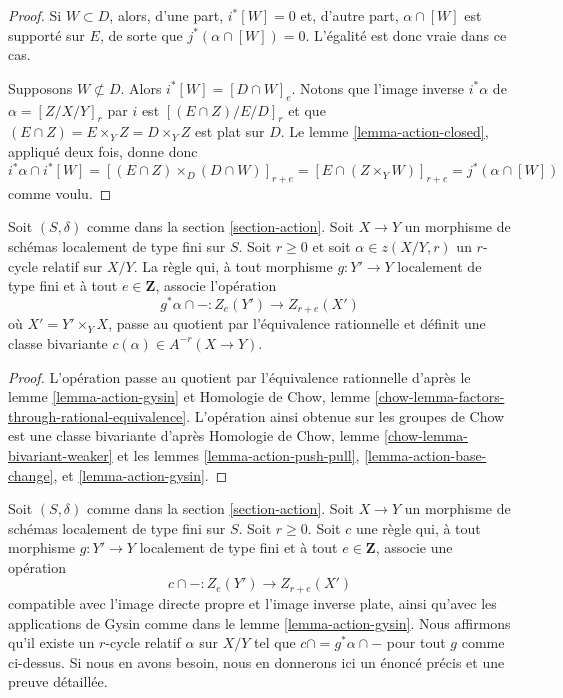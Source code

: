 \begin{proof}
\medskip\noindent
 Si $W \subset D$, alors, d'une part, $i^*[W] = 0$ et, d'autre
 part, $\alpha \cap [W]$ est supporté sur $E$, de sorte que 
$j^*(\alpha \cap [W]) = 0$. L'égalité est donc vraie dans ce cas. 

\medskip\noindent
 Supposons $W \not \subset D$. Alors $i^*[W] = [D \cap W]_e$.
 Notons que l'image inverse $i^*\alpha$ de $\alpha = [Z/X/Y]_r$
 par $i$ est $[(E \cap Z)/E/D]_r$ et que 
$(E \cap Z) = E \times_Y Z = D \times_Y Z$
 est plat sur $D$. Le lemme \ref{lemma-action-closed}, appliqué
 deux fois, donne donc 
$$
i^*\alpha \cap i^*[W] =
[(E \cap Z) \times_D (D \cap W)]_{r + e} =
[E \cap (Z \times_Y W)]_{r + e} =
j^*(\alpha \cap [W])
$$
 comme voulu. 
\end{proof} 

\begin{proposition} 
\label{proposition-get-bivariant-class} 
Soit $(S, \delta)$ comme dans la section \ref{section-action}. Soit $X \to Y$
 un morphisme de schémas localement de type fini sur $S$. Soit $r \geq 0$
 et soit $\alpha \in z(X/Y, r)$ un $r$-cycle relatif sur $X/Y$.
 La règle qui, à tout morphisme $g : Y' \to Y$ localement de type fini
 et à tout $e \in \mathbf{Z}$, associe l'opération 
$$
g^*\alpha \cap - : Z_e(Y') \to Z_{r + e}(X')
$$
 où $X' = Y' \times_Y X$, passe au quotient par l'équivalence rationnelle 
et définit une classe bivariante $c(\alpha) \in A^{-r}(X \to Y)$. 
\end{proposition} 

\begin{proof} 
L'opération passe au quotient par l'équivalence rationnelle d'après 
le lemme \ref{lemma-action-gysin} et 
Homologie de Chow, lemme \ref{chow-lemma-factors-through-rational-equivalence}. L'opération
 ainsi obtenue sur les groupes de Chow est une classe bivariante d'après 
Homologie de Chow, lemme \ref{chow-lemma-bivariant-weaker} et 
les
 lemmes \ref{lemma-action-push-pull}, \ref{lemma-action-base-change}, et 
\ref{lemma-action-gysin}. 
\end{proof} 

\begin{remark} 
\label{remark-characterize-relative-cycles} 
Soit $(S, \delta)$ comme dans la section \ref{section-action}. Soit $X \to Y$
 un morphisme de schémas localement de type fini sur $S$. Soit $r \geq 0$.
 Soit $c$ une règle qui, à tout morphisme $g : Y' \to Y$ localement de type
 fini et à tout $e \in \mathbf{Z}$, associe une opération 
$$
c \cap - : Z_e(Y') \to Z_{r + e}(X')
$$
 compatible avec l'image directe propre et l'image inverse plate, ainsi qu'avec les applications de Gysin comme dans
 le lemme \ref{lemma-action-gysin}. Nous affirmons qu'il existe un $r$-cycle relatif 
$\alpha$ sur $X/Y$ tel que $c \cap = g^*\alpha \cap -$ pour tout $g$ comme ci-dessus.
 Si nous en avons besoin, nous en donnerons ici un énoncé précis et une preuve détaillée. 
\end{remark} 









